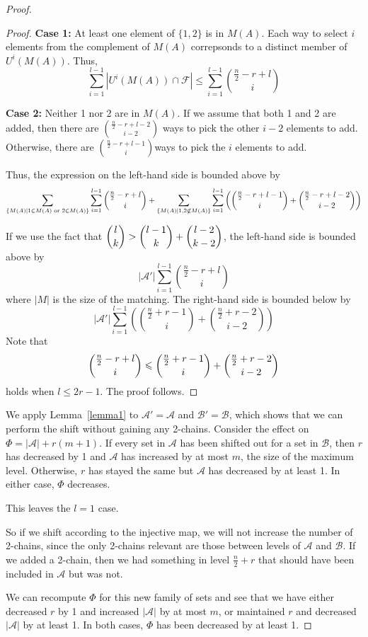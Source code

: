 \documentclass[12pt]{article}
\theoremstyle{plain}
\theoremstyle{definition}
\theoremstyle{remark}
\newcommand{\F}{\mathcal{F}}
\newcommand{\A}{\mathcal{A}}
\newcommand{\B}{\mathcal{B}}
\begin{document}
\begin{proof}
\begin{proof}
\textbf{Case 1:} At least one element of $\{1,2\}$ is in $M(A)$. Each way to select $i$ elements from the complement of $M(A)$ correpsonds to a distinct member of $U^i(M(A))$. Thus,
\[ \sum_{i = 1}^{l-1} |U^i(M(A)) \cap \F| \leq \sum_{i=1}^{l-1}\binom{\frac{n}{2}-r+l}{i}\]

\textbf{Case 2:} Neither 1 nor 2 are in $M(A)$. If we assume that both 1 and 2 are added, then there are $\binom{\frac{n}{2}-r + l - 2}{i -2}$ ways to pick the other $i - 2$ elements to add. Otherwise, there are $\binom{\frac{n}{2} - r + l - 1}{i}$ways to pick the $i$ elements to add.

Thus, the expression on the left-hand side is bounded above by
\[ \sum_{\{M(A) | 1 \in M(A) \text{ or } 2 \in M(A)\}} \sum_{i=1}^{l-1} \dbinom{\frac{n}{2}-r+l}{i} + \sum_{\{M(A) | 1, 2 \not\in M(A)\}} \sum_{i=1}^{l-1} \left( \dbinom{\frac{n}{2}-r+l-1}{i} + \dbinom{\frac{n}{2}-r+l-2}{i-2} \right) \]

If we use the fact that $\dbinom{l}{k} > \dbinom{l-1}{k} + \dbinom{l-2}{k-2}$, the left-hand side is bounded above by
\[ |\A'|\sum_{i=1}^{l-1} \binom{\frac{n}{2}-r+l}{i}\]
where $|M|$ is the size of the matching.
The right-hand side is bounded below by
\[ |\A'| \sum_{i=1}^{l-1}\left(\binom{\frac{n}{2} + r - 1}{i} + \binom{\frac{n}{2}+r-2}{i-2}\right)\]
Note that
\[ \dbinom{\frac{n}{2}-r+l}{i} \leq \dbinom{\frac{n}{2}+r-1}{i} + \dbinom{\frac{n}{2}+r-2}{i-2} \]
holds when $l \leq 2r-1$. The proof follows.
\end{proof}

We apply Lemma~\ref{lemma1} to $\A' = \A$ and $\B' = \B$, which shows that we can perform the shift without gaining any 2-chains. Consider the effect on $\Phi = |\A| + r(m+1)$. If every set in $\A$ has been shifted out for a set in $\B$, then $r$ has decreased by 1 and $\A$ has increased by at most $m$, the size of the maximum level. Otherwise, $r$ has stayed the same but $\A$ has decreased by at least 1. In either case, $\Phi$ decreases.

This leaves the $l = 1$ case. 

So if we shift according to the injective map, we will not increase the number of 2-chains, since the only 2-chains relevant are those between levels of $\A$ and $\B$. If we added a 2-chain, then we had something in level $\frac{n}{2} + r$ that should have been included in $\A$ but was not.

We can recompute $\Phi$ for this new family of sets and see that we have either decreased $r$ by 1 and increased $|\A|$ by at most $m$, or maintained $r$ and decreased $|\A|$ by at least 1. In both cases, $\Phi$ has been decreased by at least 1.


\end{proof}
\end{document}
